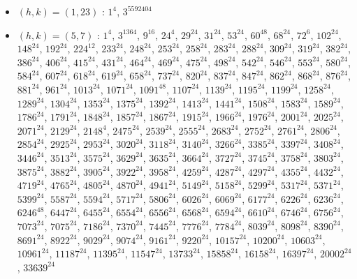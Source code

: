 \begin{itemize}
\item $(h,k)=(1,23)$ : $1^{4}$, $3^{5592404}$
\item $(h,k)=(5,7)$ : $1^{4}$, $3^{1364}$, $9^{16}$, $24^{4}$, $29^{24}$, $31^{24}$, $53^{24}$, $60^{48}$, $68^{24}$, $72^{6}$, $102^{24}$, $148^{24}$, $192^{24}$, $224^{12}$, $233^{24}$, $248^{24}$, $253^{24}$, $258^{24}$, $283^{24}$, $288^{24}$, $309^{24}$, $319^{24}$, $382^{24}$, $386^{24}$, $406^{24}$, $415^{24}$, $431^{24}$, $464^{24}$, $469^{24}$, $475^{24}$, $498^{24}$, $542^{24}$, $546^{24}$, $553^{24}$, $580^{24}$, $584^{24}$, $607^{24}$, $618^{24}$, $619^{24}$, $658^{24}$, $737^{24}$, $820^{24}$, $837^{24}$, $847^{24}$, $862^{24}$, $868^{24}$, $876^{24}$, $881^{24}$, $961^{24}$, $1013^{24}$, $1071^{24}$, $1091^{48}$, $1107^{24}$, $1139^{24}$, $1195^{24}$, $1199^{24}$, $1258^{24}$, $1289^{24}$, $1304^{24}$, $1353^{24}$, $1375^{24}$, $1392^{24}$, $1413^{24}$, $1441^{24}$, $1508^{24}$, $1583^{24}$, $1589^{24}$, $1786^{24}$, $1791^{24}$, $1848^{24}$, $1857^{24}$, $1867^{24}$, $1915^{24}$, $1966^{24}$, $1976^{24}$, $2001^{24}$, $2025^{24}$, $2071^{24}$, $2129^{24}$, $2148^{4}$, $2475^{24}$, $2539^{24}$, $2555^{24}$, $2683^{24}$, $2752^{24}$, $2761^{24}$, $2806^{24}$, $2854^{24}$, $2925^{24}$, $2953^{24}$, $3020^{24}$, $3118^{24}$, $3140^{24}$, $3266^{24}$, $3385^{24}$, $3397^{24}$, $3408^{24}$, $3446^{24}$, $3513^{24}$, $3575^{24}$, $3629^{24}$, $3635^{24}$, $3664^{24}$, $3727^{24}$, $3745^{24}$, $3758^{24}$, $3803^{24}$, $3875^{24}$, $3882^{24}$, $3905^{24}$, $3922^{24}$, $3958^{24}$, $4259^{24}$, $4287^{24}$, $4297^{24}$, $4355^{24}$, $4432^{24}$, $4719^{24}$, $4765^{24}$, $4805^{24}$, $4870^{24}$, $4941^{24}$, $5149^{24}$, $5158^{24}$, $5299^{24}$, $5317^{24}$, $5371^{24}$, $5399^{24}$, $5587^{24}$, $5594^{24}$, $5717^{24}$, $5806^{24}$, $6026^{24}$, $6069^{24}$, $6177^{24}$, $6226^{24}$, $6236^{24}$, $6246^{48}$, $6447^{24}$, $6455^{24}$, $6554^{24}$, $6556^{24}$, $6568^{24}$, $6594^{24}$, $6610^{24}$, $6746^{24}$, $6756^{24}$, $7073^{24}$, $7075^{24}$, $7186^{24}$, $7370^{24}$, $7445^{24}$, $7776^{24}$, $7784^{24}$, $8039^{24}$, $8098^{24}$, $8390^{24}$, $8691^{24}$, $8922^{24}$, $9029^{24}$, $9074^{24}$, $9161^{24}$, $9220^{24}$, $10157^{24}$, $10200^{24}$, $10603^{24}$, $10961^{24}$, $11187^{24}$, $11395^{24}$, $11547^{24}$, $13733^{24}$, $15858^{24}$, $16158^{24}$, $16397^{24}$, $20002^{24}$, $33639^{24}$

\end{itemize}

